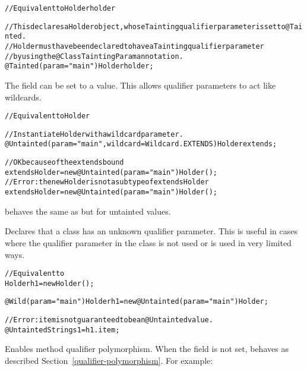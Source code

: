 \begin{description}
\begin{alltt}
  // Equivalent to Holder holder

  // This declares a Holder object, whose Tainting qualifier parameter is set to @Tainted.
  // Holder must have been declared to have a Tainting qualifier parameter
  // by using the @ClassTaintingParam annotation.
  @Tainted(param="main") Holder holder;
\end{alltt}

The  field can be set to a
 value. This allows qualifier
parameters to act like wildcards.

\begin{alltt}

  // Equivalent to Holder

  // Instantiate Holder with a wildcard parameter.
  @Untainted(param="main", wildcard=Wildcard.EXTENDS) Holder extends;

  // OK because of the extends bound
  extendsHolder = new @Untainted(param="main") Holder();
  // Error: the new Holder is not a subtype of extendsHolder
  extendsHolder = new @Untainted(param="main") Holder();

\end{alltt}

\item[\refqualclass{checker/tainting/qual}{Untainted}]
 behaves the same as  but for untainted values.

\item[\refqualclass{checker/tainting/qual}{Wild}] Declares
that a class has an unknown qualifier parameter. This is useful in cases
where the qualifier parameter in the class is not used or is used in very
limited ways.

\begin{alltt}

  // Equivalent to
  Holder h1 = new Holder();

  @Wild(param="main") Holder h1 = new @Untainted(param="main") Holder;

  // Error: item is not guaranteed to be an @Untainted value.
  @Untainted String s1 = h1.item;

\end{alltt}

\item[\refqualclass{checker/tainting/qual}{PolyTainted}]
Enables method qualifier polymorphism. When the field  is not set,
 behaves as described
Section~\ref{qualifier-polymorphism}. For example:


\end{description}

